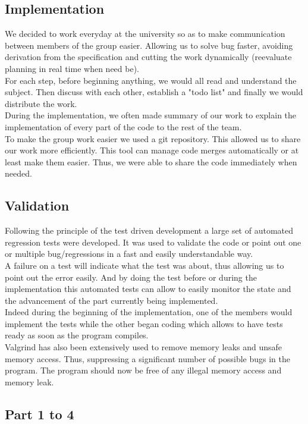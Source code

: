 \subsection{Implementation}
We decided to work everyday at the university so as to make communication
between members of the group easier. Allowing us to solve bug faster, avoiding
derivation from the specification and cutting the work dynamically (reevaluate
planning in real time when need be).\\
For each step, before beginning anything, we would all read and understand the
subject. Then discuss with each other, establish a "todo list" and finally we
would distribute the work.\\ 
During the implementation, we often made summary of our work to explain the
implementation of every part of the code to the rest of the team.\\
To make the group work easier we used a git repository. This allowed us to
share our work more efficiently. This tool can manage code merges automatically
or at least make them easier. Thus, we were able to share the code immediately
when needed.\\

\subsection{Validation}
Following the principle of the test driven development a large set of automated
regression tests were developed. It was used to validate the code or point out
one or multiple bug/regressions in a fast and easily understandable way. \\
A failure on a test will indicate what the test was about, thus allowing us to
point out the error easily. And by doing the test before or during the
implementation this automated tests can allow to easily monitor the state and
the advancement of the part currently being implemented.\\
Indeed during the beginning of the implementation, one of the members would
implement the tests while the other began coding which allows to have tests
ready as soon as the program compiles.\\
Valgrind has also been extensively used to remove memory leaks and unsafe
memory access. Thus, suppressing a significant number of possible bugs in the
program. The program should now be free of any illegal memory access and memory
leak.

\subsection{Part 1 to 4}

